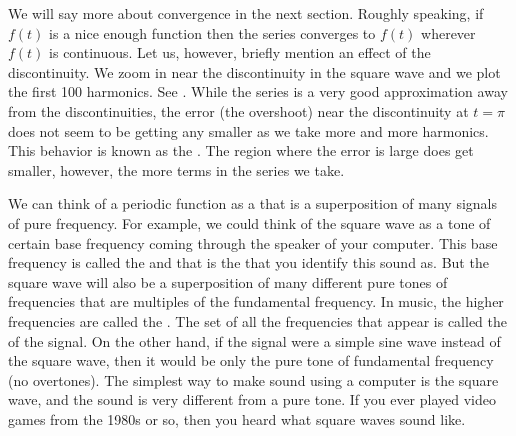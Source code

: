 We will say more about convergence in the next section.
Roughly speaking,
if $f(t)$ is a nice enough function then the series
converges to $f(t)$ wherever $f(t)$ is continuous.  Let us, however,
briefly mention an effect of the discontinuity.
We zoom in near the discontinuity in the square wave
and we plot the first 100 harmonics.  See
.  While the
series is a very good approximation away from the discontinuities, the error
(the overshoot)
near the discontinuity at $t=\pi$ does not seem to be getting any smaller
as we take more and more harmonics.
This behavior is known as the \emph{}.
The region where the error is large does get smaller, however, the more
terms in the series we take.

\begin{myfig}
\capstart
{}
\caption{Gibbs phenomenon in action.\label{ts:squarewavegibbsfig}}
\end{myfig}

\medskip

We can think of a periodic function as a 
that is a superposition of
many signals of pure frequency.
For example, we could think of the square
wave as a tone of certain base frequency
coming through the speaker of your computer.
This base frequency is called the
\emph{}
and that is the  that you identify this sound as.
But the square wave will also be
a superposition of
many different pure tones of frequencies that are multiples of the
fundamental frequency.
In music,
the higher frequencies are called the \emph{}.
The set of all the frequencies that appear is called the
\emph{} of the signal.
On the other hand,
if the signal were
a simple sine wave instead of the square wave,
then it would be only the pure tone of
fundamental frequency (no overtones).
The simplest way to make sound using a computer is the square wave,
and the sound is very different from a pure tone.
If you ever played video games
from the 1980s or so, then you heard what square waves sound like.

